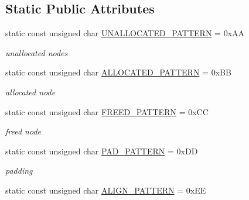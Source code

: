\subsection*{Static Public Attributes}
\begin{DoxyCompactItemize}
\item 
\hypertarget{classObjectAllocator_a41c6ff61d0f553ddb7ee1942ff02752b}{static const unsigned char \hyperlink{classObjectAllocator_a41c6ff61d0f553ddb7ee1942ff02752b}{U\-N\-A\-L\-L\-O\-C\-A\-T\-E\-D\-\_\-\-P\-A\-T\-T\-E\-R\-N} = 0x\-A\-A}\label{classObjectAllocator_a41c6ff61d0f553ddb7ee1942ff02752b}

\begin{DoxyCompactList}\small\item\em unallocated nodes \end{DoxyCompactList}\item 
\hypertarget{classObjectAllocator_aef36599808e28924faa018bc08435ca0}{static const unsigned char \hyperlink{classObjectAllocator_aef36599808e28924faa018bc08435ca0}{A\-L\-L\-O\-C\-A\-T\-E\-D\-\_\-\-P\-A\-T\-T\-E\-R\-N} = 0x\-B\-B}\label{classObjectAllocator_aef36599808e28924faa018bc08435ca0}

\begin{DoxyCompactList}\small\item\em allocated node \end{DoxyCompactList}\item 
\hypertarget{classObjectAllocator_ad0a3b63c24b19422109ee940cdfc0475}{static const unsigned char \hyperlink{classObjectAllocator_ad0a3b63c24b19422109ee940cdfc0475}{F\-R\-E\-E\-D\-\_\-\-P\-A\-T\-T\-E\-R\-N} = 0x\-C\-C}\label{classObjectAllocator_ad0a3b63c24b19422109ee940cdfc0475}

\begin{DoxyCompactList}\small\item\em freed node \end{DoxyCompactList}\item 
\hypertarget{classObjectAllocator_a81447b175985013c4339c42f6adc42aa}{static const unsigned char \hyperlink{classObjectAllocator_a81447b175985013c4339c42f6adc42aa}{P\-A\-D\-\_\-\-P\-A\-T\-T\-E\-R\-N} = 0x\-D\-D}\label{classObjectAllocator_a81447b175985013c4339c42f6adc42aa}

\begin{DoxyCompactList}\small\item\em padding \end{DoxyCompactList}\item 
\hypertarget{classObjectAllocator_ac4e9b2ce134baaafc6eb82b6e0dfeb44}{static const unsigned char \hyperlink{classObjectAllocator_ac4e9b2ce134baaafc6eb82b6e0dfeb44}{A\-L\-I\-G\-N\-\_\-\-P\-A\-T\-T\-E\-R\-N} = 0x\-E\-E}\label{classObjectAllocator_ac4e9b2ce134baaafc6eb82b6e0dfeb44}


\end{DoxyCompactItemize}
